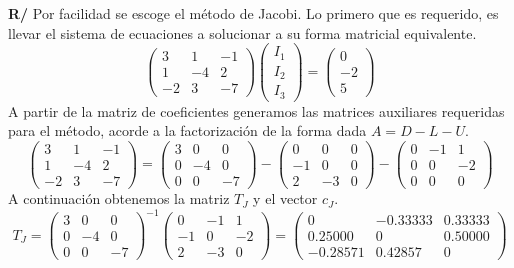\documentclass[12pt]{article}
\begin{document}
\begin{enumerate}[leftmargin=*,widest=9]
{\begin{enumerate}[label=\alph*]
   \textbf{R/} Por facilidad se escoge el método de Jacobi. Lo primero que es requerido, es llevar el sistema de ecuaciones a solucionar a su forma matricial equivalente.
   \[
\begin{pmatrix} 3 & 1 & -1\\ 1 & -4 & 2\\ -2 & 3 & -7 \end{pmatrix}
\begin{pmatrix} I_1 \\ I_2 \\ I_3 \end{pmatrix} = \begin{pmatrix} 0 \\ -2 \\ 5 \end{pmatrix}
   \]
   A partir de la matriz de coeficientes generamos las matrices auxiliares requeridas para el método, acorde a la factorización de la forma dada \(A = D - L - U\).
   \[
\begin{pmatrix} 3 & 1 & -1\\ 1 & -4 & 2\\ -2 & 3 & -7 \end{pmatrix} = \begin{pmatrix} 3 & 0 & 0\\ 0 & -4 & 0\\ 0 & 0 & -7 \end{pmatrix} -
\begin{pmatrix} 0 & 0 & 0\\ -1 & 0 & 0\\ 2 & -3 & 0 \end{pmatrix} - \begin{pmatrix} 0 & -1 & 1\\ 0 & 0 & -2\\ 0 & 0 & 0 \end{pmatrix}
   \]
   A continuación obtenemos la matriz \(T_J\) y el vector \(c_J\).
   \[
T_J = \begin{pmatrix} 3 & 0 & 0\\ 0 & -4 & 0\\ 0 & 0 & -7 \end{pmatrix}^{-1}\begin{pmatrix} 0 & -1 & 1\\ -1 & 0 & -2\\ 2 & -3 & 0 \end{pmatrix} =
\begin{pmatrix}0 & -0.33333 & 0.33333\\ 0.25000 & 0 & 0.50000\\ -0.28571 & 0.42857 & 0 \end{pmatrix}
\]
\end{enumerate}}
\end{enumerate}
\end{document}
